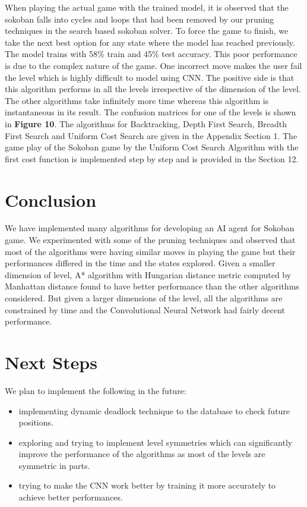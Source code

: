 \documentclass[10pt, final]{article}
\begin{document}
\begin{multicols}{2}
	When playing the actual game with the trained model, it is observed that the sokoban falls into cycles and loops that had been removed by our pruning techniques in the search based sokoban solver. To force the game to finish, we take the next best option for any state where the model has reached previously.
	The model trains with 58\% train and 45\% test accuracy. This poor performance is due to the complex nature of the game. One incorrect move makes the user fail the level which is highly difficult to model using CNN. The positive side is that this algorithm performs in all the levels irrespective of the dimension of the level. The other algorithms take infinitely more time whereas this algorithm is instantaneous in its result. The confusion matrices for one of the levels is shown in \textbf{Figure 10}.
The algorithms for Backtracking, Depth First Search, Breadth First Search and Uniform Cost Search are given in the Appendix Section 1. The game play of the Sokoban game by the Uniform Cost Search Algorithm with the first cost function is implemented step by step and is provided in the Section 12.
	\section{Conclusion}
	We have implemented many algorithms for developing an AI agent for Sokoban game. We experimented with some of the pruning techniques and observed that most of the algorithms were having similar moves in playing the game but their performances differed in the time and the states explored. Given a smaller dimension of level, A* algorithm with Hungarian distance metric computed by Manhattan distance found to have better performance than the other algorithms considered. But given a larger dimensions of the level, all the algorithms are constrained by time and the Convolutional Neural Network had fairly decent performance.  
	\section{Next Steps}
	We plan to implement the following in the future:
	\begin{itemize}
		\item implementing dynamic deadlock technique to the database to check future positions.
		\item exploring and trying to implement level symmetries which can significantly improve the performance of the algorithms as most of the levels are symmetric in parts.
		\item trying to make the CNN work better by training it more accurately to achieve better performances.
	\end{itemize}

\end{multicols}
\end{document}
